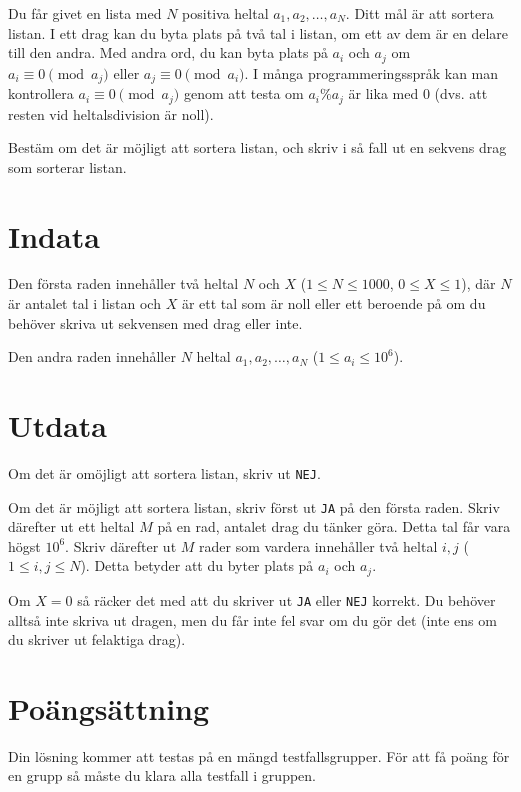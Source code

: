 
Du får givet en lista med $N$ positiva heltal $a_1, a_2, \dots, a_N$. Ditt mål är att sortera listan. I ett drag kan du byta plats på 
två tal i listan, om ett av dem är en delare till den andra. Med andra ord, du kan byta plats på $a_i$ och $a_j$ om $a_i \equiv 0 \pmod{a_j}$ eller 
$a_j \equiv 0 \pmod{a_i}$.
I många programmeringsspråk kan man kontrollera $a_i \equiv 0 \pmod{a_j}$ genom att testa om $a_i \% a_j$ är lika med $0$ (dvs. att resten vid heltalsdivision är noll).

Bestäm om det är möjligt att sortera listan, och skriv i så fall ut en sekvens drag som sorterar listan.


\section*{Indata}
Den första raden innehåller två heltal $N$ och $X$ ($1 \leq N \leq 1000$, $0 \leq X \leq 1$), där $N$ är antalet tal i listan och $X$ är ett 
tal som är noll eller ett beroende på om du behöver skriva ut sekvensen med drag eller inte.

Den andra raden innehåller $N$ heltal $a_1, a_2, \dots, a_N$ ($1 \leq a_i \leq 10^6$). 

\section*{Utdata}
Om det är omöjligt att sortera listan, skriv ut \verb|NEJ|. 

Om det är möjligt att sortera listan, skriv först ut \verb|JA| på den första raden. Skriv därefter ut ett heltal $M$ på en rad, antalet drag
du tänker göra. Detta tal får vara högst $10^6$. Skriv därefter ut $M$ rader som vardera innehåller två heltal $i, j$ ($1 \leq i,j \leq N$).
Detta betyder att du byter plats på $a_i$ och $a_j$.

Om $X = 0$ så räcker det med att du skriver ut \verb|JA| eller \verb|NEJ| korrekt. Du behöver alltså inte skriva ut dragen, men du får inte fel svar 
om du gör det (inte ens om du skriver ut felaktiga drag).

\section*{Poängsättning}
Din lösning kommer att testas på en mängd testfallsgrupper.
För att få poäng för en grupp så måste du klara alla testfall i gruppen.


